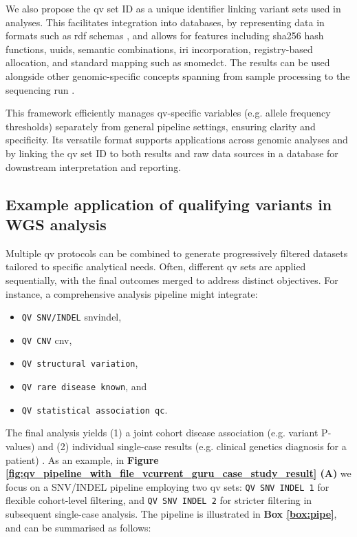 We also propose the \ac{qv} set ID as a unique identifier linking variant sets used in analyses. This facilitates integration into databases,
by representing data in formats such as \ac{rdf} schemas \cite{toure2023fairification}, and allows for features including \ac{sha256} hash functions, \ac{uuid}s, semantic combinations, \ac{iri} incorporation, registry-based allocation, and standard mapping such as \ac{snomedct}. The results can be used alongside other genomic-specific concepts spanning from sample processing to the sequencing run \cite{van2023bridging}.

This framework efficiently manages \ac{qv}-specific variables (e.g. allele frequency thresholds) separately from general pipeline settings, ensuring clarity and specificity. Its versatile format supports applications across genomic analyses and by linking the \ac{qv} set ID to both results and raw data sources in a database for downstream interpretation and reporting.

\subsection{Example application of qualifying variants in WGS analysis}

Multiple \ac{qv} protocols can be combined to generate progressively filtered datasets tailored to specific analytical needs. Often, different \ac{qv} sets are applied sequentially, with the final outcomes merged to address distinct objectives. For instance, a comprehensive analysis pipeline might integrate:
\begin{itemize}
  \item \colorbox{kispiblue!05}{\texttt{QV SNV/INDEL}}  \ac{snvindel},
  \item \colorbox{kispiblue!05}{\texttt{QV CNV}} \ac{cnv},
  \item \colorbox{kispiblue!05}{\texttt{QV structural variation}},
  \item \colorbox{kispiblue!05}{\texttt{QV rare disease known}}, and 
  \item \colorbox{kispiblue!05}{\texttt{QV statistical association \ac{qc}}}.
\end{itemize}
The final analysis yields (1) a joint cohort disease association (e.g. variant P-values) and (2) individual single-case results (e.g. clinical genetics diagnosis for a patient)
\cite{auwera_genomics_2020, li2025statistical}.
As an example, in 
\textbf{Figure \ref{fig:qv_pipeline_with_file_vcurrent_guru_case_study_result} (A)}
we focus on a SNV/INDEL pipeline employing two \ac{qv} sets:
\colorbox{colorSUNSET2!20}{\texttt{QV SNV INDEL 1}} for flexible cohort-level filtering, and 
\colorbox{colorSUNSET2!20}{\texttt{QV SNV INDEL 2}} for stricter filtering in subsequent single-case analysis. The pipeline is illustrated in \textbf{Box \ref{box:pipe}}, and can be summarised as follows:

